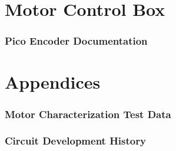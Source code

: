 \documentclass[a4paper,10pt]{article}
\begin{document}
\part{Motor Control Box}

\clearpage

\clearpage

\clearpage
\section{Pico Encoder Documentation}

\clearpage


\clearpage


\clearpage
\appendix
\part*{Appendices}

\section{Motor Characterization Test Data}
\label{app:motor_testing}

\clearpage

\clearpage

\clearpage

\section{Circuit Development History}
\label{app:circuit_dev}

\clearpage

\clearpage



\fontsize{8}{9}\selectfont

\end{document}
